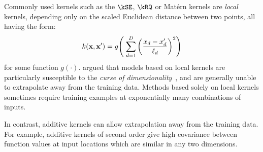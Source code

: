 Commonly used kernels such as the $\kSE$, $\kRQ$ or Mat\'{e}rn kernels are \emph{local} kernels, depending only on the scaled Euclidean distance between two points, all having the form:
\begin{align}
k({\bf x, x'}) = g \!\left( \; \sum_{d=1}^D \left( \frac{  x_{d} - x_{d}' }{ \ell_d } \right)^2 \right)
\end{align}
for some function $g(\cdot)$.
\citet{bengio2006curse} argued that models based on local kernels are particularly susceptible to the \emph{curse of dimensionality}~\citep{bellman1956dynamic}, and are generally unable to extrapolate away from the training data.
Methods based solely on local kernels sometimes require training examples at exponentially many combinations of inputs.

In contrast, additive kernels can allow extrapolation away from the training data.
For example, additive kernels of second order give high covariance between function values at input locations which are similar in any two dimensions.

